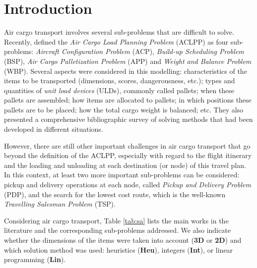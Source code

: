\documentclass[preprint,authoryear]{elsarticle}
\begin{document}
\label{sec1}
\section{Introduction}


Air cargo transport involves several sub-problems that are difficult to solve. Recently, \cite[p. 401]{BrandtStefan2019} defined the {\it Air Cargo Load Planning Problem} (ACLPP) as four sub-problems: {\it Aircraft Configuration Problem} (ACP), {\it Build-up Scheduling Problem} (BSP), {\it Air Cargo Palletization Problem} (APP) and {\it Weight and Balance Problem} (WBP). Several aspects were considered in this modelling: characteristics of the items to be transported (dimensions, scores, dangerousness, etc.); types and quantities of {\it unit load devices} (ULDs), commonly called pallets; when these pallets are assembled; how items are allocated to pallets; in which positions these pallets are to be placed; how the total cargo weight is balanced; etc. They also presented a comprehensive bibliographic survey of solving methods that had been developed in different situations.

However, there are still other important challenges in air cargo transport that go beyond the definition of the ACLPP, especially with regard to the flight itinerary and the loading and unloading at each destination (or node) of this travel plan. In this context, at least two more important sub-problems can be considered: pickup and delivery operations at each node, called {\it Pickup and Delivery Problem} (PDP), and the search for the lowest cost route, which is the well-known {\it Travelling Salesman Problem} (TSP).

Considering air cargo transport, Table \ref{tab:sa} lists the main works in the literature and the corresponding sub-problems addressed. We also indicate whether the dimensions of the items were taken into account ({\bf 3D} or {\bf 2D}) and which solution method was used: heuristics ({\bf Heu}), integers ({\bf Int}), or linear programming ({\bf Lin}).
\end{document}
